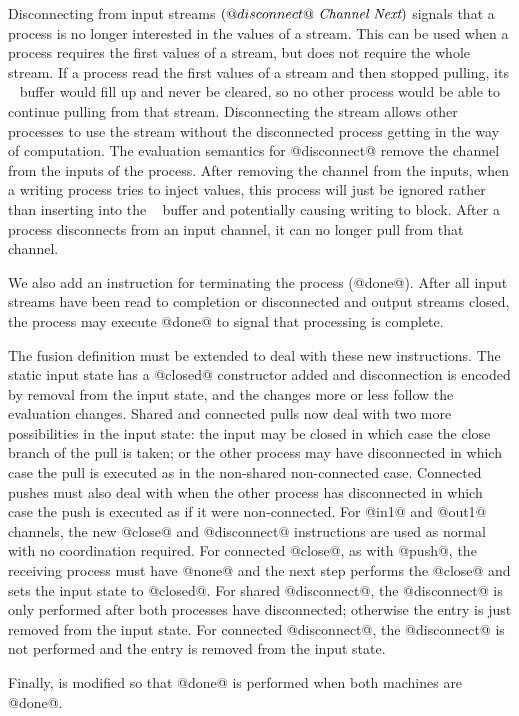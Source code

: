 Disconnecting from input streams $(@disconnect@~\textit{Channel}~\textit{Next})$ signals that a process is no longer interested in the values of a stream.
This can be used when a process requires the first values of a stream, but does not require the whole stream.
If a process read the first values of a stream and then stopped pulling, its \InputState~ buffer would fill up and never be cleared, so no other process would be able to continue pulling from that stream.
Disconnecting the stream allows other processes to use the stream without the disconnected process getting in the way of computation.
The evaluation semantics for @disconnect@ remove the channel from the inputs of the process.
After removing the channel from the inputs, when a writing process tries to inject values, this process will just be ignored rather than inserting into the \InputState~ buffer and potentially causing writing to block.
After a process disconnects from an input channel, it can no longer pull from that channel.

We also add an instruction for terminating the process (@done@).
After all input streams have been read to completion or disconnected and output streams closed, the process may execute @done@ to signal that processing is complete.

The fusion definition must be extended to deal with these new instructions.
The static input state has a @closed@ constructor added and disconnection is encoded by removal from the input state, and the  changes more or less follow the evaluation changes.
Shared and connected pulls now deal with two more possibilities in the input state: the input may be closed in which case the close branch of the pull is taken; or the other process may have disconnected in which case the pull is executed as in the non-shared non-connected case.
Connected pushes must also deal with when the other process has disconnected in which case the push is executed as if it were non-connected.
For @in1@ and @out1@ channels, the new @close@ and @disconnect@ instructions are used as normal with no coordination required.
For connected @close@, as with @push@, the receiving process must have @none@ and the next step performs the @close@ and sets the input state to @closed@.
For shared @disconnect@, the @disconnect@ is only performed after both processes have disconnected; otherwise the entry is just removed from the input state.
For connected @disconnect@, the @disconnect@ is not performed and the entry is removed from the input state.

Finally,  is modified so that @done@ is performed when both machines are @done@.

